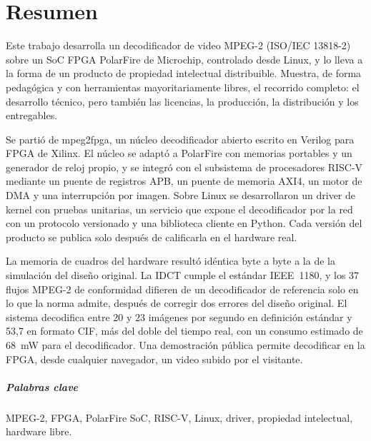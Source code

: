 \chapter*{Resumen}

Este trabajo desarrolla un decodificador de video MPEG-2 (ISO/IEC 13818-2)
sobre un SoC FPGA PolarFire de Microchip, controlado desde Linux, y lo lleva
a la forma de un producto de propiedad intelectual distribuible. Muestra, de
forma pedagógica y con herramientas mayoritariamente libres, el recorrido
completo: el desarrollo técnico, pero también las licencias, la producción,
la distribución y los entregables.

Se partió de mpeg2fpga, un núcleo decodificador abierto escrito en Verilog
para FPGA de Xilinx. El núcleo se adaptó a PolarFire con memorias portables y
un generador de reloj propio, y se integró con el subsistema de procesadores
RISC-V mediante un puente de registros APB, un puente de memoria AXI4, un
motor de DMA y una interrupción por imagen. Sobre Linux se desarrollaron un
driver de kernel con pruebas unitarias, un servicio que expone el
decodificador por la red con un protocolo versionado y una biblioteca cliente
en Python. Cada versión del producto se publica solo después de calificarla en
el hardware real.

La memoria de cuadros del hardware resultó idéntica byte a byte a la de la
simulación del diseño original. La IDCT cumple el estándar IEEE~1180, y los
37 flujos MPEG-2 de conformidad difieren de un decodificador de referencia
solo en lo que la norma admite, después de corregir dos errores del diseño
original. El sistema decodifica entre 20 y 23 imágenes por segundo en
definición estándar y 53,7 en formato CIF, más del doble del tiempo real,
con un consumo estimado de 68~mW para el decodificador. Una demostración
pública permite decodificar en la FPGA, desde cualquier navegador, un video
subido por el visitante.

\paragraph{Palabras clave}
MPEG-2, FPGA, PolarFire SoC, RISC-V, Linux, driver, propiedad intelectual,
hardware libre.

